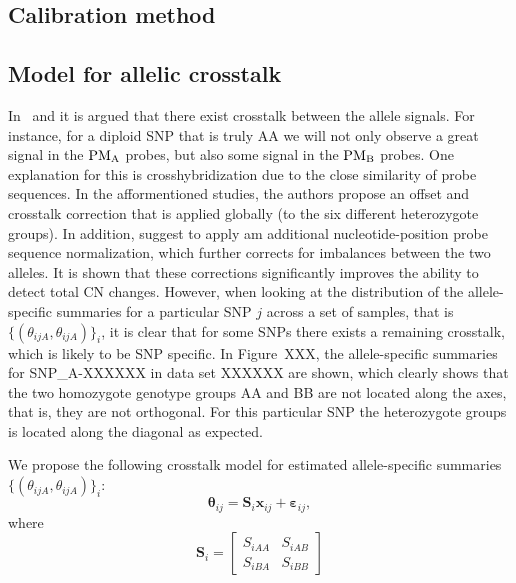 \documentclass[draft]{bioinfo}
\newcommand{\PMA}{\ensuremath{\textnormal{PM}_\textnormal{A}}\xspace}
\newcommand{\PMB}{\ensuremath{\textnormal{PM}_\textnormal{B}}\xspace}
\newcommand{\bx}{\mathbf{x}\xspace}
\newcommand{\bS}{\mathbf{S}\xspace}
\newcommand{\beps}{\bm{\varepsilon}\xspace}
\newcommand{\btheta}{\bm{\theta}\xspace}
\begin{document}
\begin{methods}
\section{Calibration method}

\subsection{Model for allelic crosstalk}
\label{secACCModel}
In~\citet{BengtssonH_etal_2008} and \citet{BengtssonH_etal_2009b} it is argued that there exist crosstalk between the allele signals.  For instance, for a diploid SNP that is truly AA we will not only observe a great signal in the \PMA probes, but also some signal in the \PMB probes.  One explanation for this is crosshybridization due to the close similarity of probe sequences.  In the afformentioned studies, the authors propose an offset and crosstalk correction that is applied globally (to the six different heterozygote groups).  In addition, \citet{BengtssonH_etal_2009b} suggest to apply am additional nucleotide-position probe sequence normalization, which further corrects for imbalances between the two alleles.  It is shown that these corrections significantly improves the ability to detect total CN changes.
However, when looking at the distribution of the allele-specific summaries for a particular SNP $j$ across a set of samples, that is $\{(\theta_{ijA},\theta_{ijA})\}_i$, it is clear that for some SNPs there exists a remaining crosstalk, which is likely to be SNP specific.  In Figure~XXX, the allele-specific summaries for SNP\_A-XXXXXX in data set XXXXXX are shown, which clearly shows that the two homozygote genotype groups AA and BB are not located along the axes, that is, they are not orthogonal. For this particular SNP the heterozygote groups is located along the diagonal as expected.

We propose the following crosstalk model for estimated allele-specific summaries $\{(\theta_{ijA},\theta_{ijA})\}_i$:
\begin{equation}
  \btheta_{ij} = \bS_i \bx_{ij} + \beps_{ij},
  \label{eqnACCi}
\end{equation}
where 
\begin{equation}
 \bS_i = 
 \begin{bmatrix}
   S_{iAA} & S_{iAB} \\
   S_{iBA} & S_{iBB}
 \end{bmatrix}
  \label{eqnACCii}
\end{equation}



\end{methods}
\end{document}
